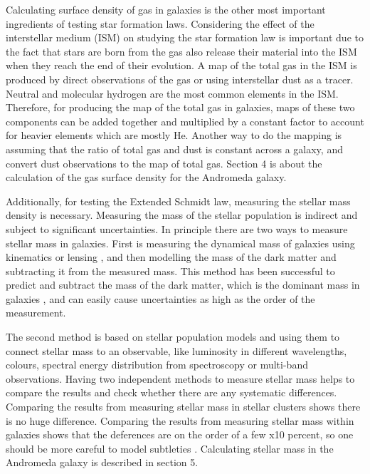 \documentclass[useAMS,usenatbib]{mn2e}
\begin{document}
Calculating surface density of gas in galaxies is the other most important ingredients of testing star formation laws. Considering the effect of the interstellar medium (ISM) on studying the star formation law is important due to the fact that stars are born from the gas also release their material into the ISM when they reach the end of their evolution. A map of the total gas in the ISM is produced by direct observations of the gas or using interstellar dust as a tracer. Neutral and molecular hydrogen are the most common elements in the ISM. Therefore, for producing the map of the total gas in galaxies, maps of these two components can be added together and multiplied by a constant factor to account for heavier elements which are mostly He. Another way to do the mapping is assuming that the ratio of total gas and dust is constant across a galaxy, and convert dust observations to the map of total gas. Section 4 is about the calculation of the gas surface density for the Andromeda galaxy.


Additionally, for testing the Extended Schmidt law, measuring the stellar mass density is necessary. Measuring the mass of the stellar population is indirect and subject to significant uncertainties. In principle there are two ways to measure stellar mass in galaxies. First is measuring the dynamical mass of galaxies using kinematics \citep{Cappellari06} or lensing \citep{Auger09}, and then modelling the mass of the dark matter and subtracting it from the measured mass. This method has been successful to predict and subtract the mass of the dark matter, which is the dominant mass in galaxies \citep{Zaritsky94},  and can easily cause uncertainties as high as the order of the measurement.

The second method is based on stellar population models \citep[e.g.][]{ Bruzual93, Kotulla09} and using them to connect stellar mass to an observable, like luminosity in different wavelengths, colours, spectral energy distribution from spectroscopy or multi-band observations. Having two independent methods to measure stellar mass helps to compare the results and check whether there are any systematic differences. Comparing the results from measuring stellar mass in stellar clusters shows there is no huge difference. Comparing the results from measuring stellar mass within galaxies shows that the deferences are on the order of a few x10 percent, so one should be more careful to model subtleties \citep{McLaughlin05}. Calculating stellar mass in the Andromeda galaxy is described in section 5.
\end{document}
